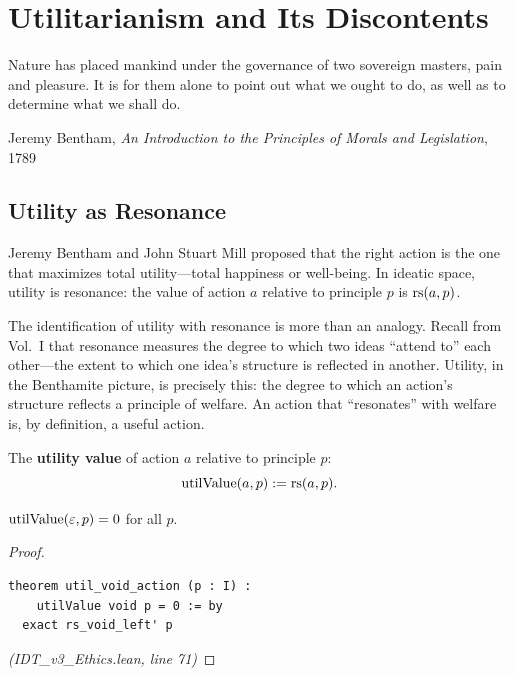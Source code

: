 \chapter{Utilitarianism and Its Discontents}
\label{ch:utilitarianism}

\epigraph{Nature has placed mankind under the governance of two sovereign masters, pain and pleasure. It is for them alone to point out what we ought to do, as well as to determine what we shall do.}{Jeremy Bentham, \textit{An Introduction to the Principles of Morals and Legislation}, 1789}

\section{Utility as Resonance}

Jeremy Bentham and John Stuart Mill proposed that the right action is the one
that maximizes total utility---total happiness or well-being. In ideatic space,
utility is resonance: the value of action $a$ relative to principle $p$ is
$\mathrm{rs}(a, p)$.

The identification of utility with resonance is more than an analogy. Recall
from Vol.~I that resonance measures the degree to which two ideas ``attend to''
each other---the extent to which one idea's structure is reflected in another.
Utility, in the Benthamite picture, is precisely this: the degree to which
an action's structure reflects a principle of welfare. An action that
``resonates'' with welfare is, by definition, a useful action.

\begin{definition}
\label{def:utility}
The \textbf{utility value} of action $a$ relative to principle $p$:
\[
  \mathrm{utilValue}(a, p) := \mathrm{rs}(a, p).
\]
\end{definition}

\begin{theorem}
\label{thm:util-void}
$\mathrm{utilValue}(\varepsilon, p) = 0$ for all $p$.
\end{theorem}

\begin{proof}
\begin{lstlisting}
theorem util_void_action (p : I) :
    utilValue void p = 0 := by
  exact rs_void_left' p
\end{lstlisting}
\textit{(IDT\_v3\_Ethics.lean, line 71)}
\end{proof}

